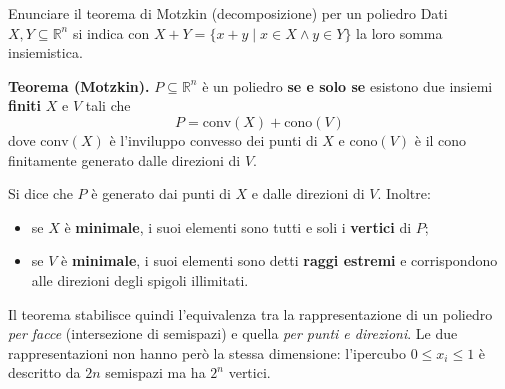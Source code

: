 \documentclass[12pt]{extarticle} %
\begin{document}
\begin{teoriabox}{Enunciare il teorema di Motzkin (decomposizione) per un poliedro}
Dati $X, Y \subseteq \mathbb{R}^n$ si indica con $X+Y = \{x+y \mid x \in X \wedge y \in Y\}$ la loro somma insiemistica.

\noindent\textbf{Teorema (Motzkin).} $P \subseteq \mathbb{R}^n$ è un poliedro \textbf{se e solo se} esistono due insiemi \textbf{finiti} $X$ e $V$ tali che
\[
P = \text{conv}(X) + \text{cono}(V)
\]
dove $\text{conv}(X)$ è l'inviluppo convesso dei punti di $X$ e $\text{cono}(V)$ è il cono finitamente generato dalle direzioni di $V$.

\noindent Si dice che $P$ è generato dai punti di $X$ e dalle direzioni di $V$. Inoltre:
\begin{itemize}
    \item se $X$ è \textbf{minimale}, i suoi elementi sono tutti e soli i \textbf{vertici} di $P$;
    \item se $V$ è \textbf{minimale}, i suoi elementi sono detti \textbf{raggi estremi} e corrispondono alle direzioni degli spigoli illimitati.
\end{itemize}
Il teorema stabilisce quindi l'equivalenza tra la rappresentazione di un poliedro \textit{per facce} (intersezione di semispazi) e quella \textit{per punti e direzioni}. Le due rappresentazioni non hanno però la stessa dimensione: l'ipercubo $0 \le x_i \le 1$ è descritto da $2n$ semispazi ma ha $2^n$ vertici.
\end{teoriabox}
\end{document}
